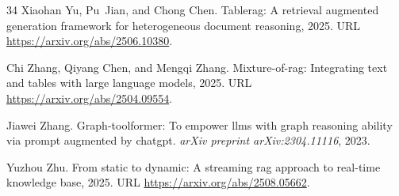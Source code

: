 \begin{thebibliography}{34}
Xiaohan Yu, Pu~Jian, and Chong Chen.
\newblock Tablerag: A retrieval augmented generation framework for heterogeneous document reasoning, 2025.
\newblock URL \url{https://arxiv.org/abs/2506.10380}.

Chi Zhang, Qiyang Chen, and Mengqi Zhang.
\newblock Mixture-of-rag: Integrating text and tables with large language models, 2025.
\newblock URL \url{https://arxiv.org/abs/2504.09554}.

Jiawei Zhang.
\newblock Graph-toolformer: To empower llms with graph reasoning ability via prompt augmented by chatgpt.
\newblock \emph{arXiv preprint arXiv:2304.11116}, 2023.

Yuzhou Zhu.
\newblock From static to dynamic: A streaming rag approach to real-time knowledge base, 2025.
\newblock URL \url{https://arxiv.org/abs/2508.05662}.

\end{thebibliography}
